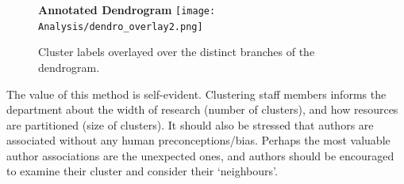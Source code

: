 \begin{center}
\begin{figure}[H]
  \centering
  \textbf{Annotated Dendrogram}
    \texttt{[image: Analysis/dendro\_overlay2.png]}
    \caption[Dendrogram annotated with labelled fields]{Cluster labels overlayed over the distinct branches of the dendrogram.}
    \label{fig:LABELLEDDENDRO}
\end{figure} 
\end{center}
The value of this method is self-evident. Clustering staff members informs the department about the width of research (number of clusters), and how resources are partitioned (size of clusters). It should also be stressed that authors are associated without any human preconceptions/bias. Perhaps the most valuable author associations are the unexpected ones, and authors should be encouraged to examine their cluster and consider their `neighbours'.
